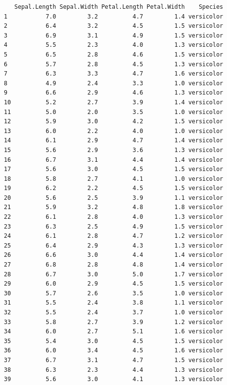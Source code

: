 \documentclass[
  a4paper,
]{ltjsbook}
\begin{document}
\begin{verbatim}
   Sepal.Length Sepal.Width Petal.Length Petal.Width    Species
1           7.0         3.2          4.7         1.4 versicolor
2           6.4         3.2          4.5         1.5 versicolor
3           6.9         3.1          4.9         1.5 versicolor
4           5.5         2.3          4.0         1.3 versicolor
5           6.5         2.8          4.6         1.5 versicolor
6           5.7         2.8          4.5         1.3 versicolor
7           6.3         3.3          4.7         1.6 versicolor
8           4.9         2.4          3.3         1.0 versicolor
9           6.6         2.9          4.6         1.3 versicolor
10          5.2         2.7          3.9         1.4 versicolor
11          5.0         2.0          3.5         1.0 versicolor
12          5.9         3.0          4.2         1.5 versicolor
13          6.0         2.2          4.0         1.0 versicolor
14          6.1         2.9          4.7         1.4 versicolor
15          5.6         2.9          3.6         1.3 versicolor
16          6.7         3.1          4.4         1.4 versicolor
17          5.6         3.0          4.5         1.5 versicolor
18          5.8         2.7          4.1         1.0 versicolor
19          6.2         2.2          4.5         1.5 versicolor
20          5.6         2.5          3.9         1.1 versicolor
21          5.9         3.2          4.8         1.8 versicolor
22          6.1         2.8          4.0         1.3 versicolor
23          6.3         2.5          4.9         1.5 versicolor
24          6.1         2.8          4.7         1.2 versicolor
25          6.4         2.9          4.3         1.3 versicolor
26          6.6         3.0          4.4         1.4 versicolor
27          6.8         2.8          4.8         1.4 versicolor
28          6.7         3.0          5.0         1.7 versicolor
29          6.0         2.9          4.5         1.5 versicolor
30          5.7         2.6          3.5         1.0 versicolor
31          5.5         2.4          3.8         1.1 versicolor
32          5.5         2.4          3.7         1.0 versicolor
33          5.8         2.7          3.9         1.2 versicolor
34          6.0         2.7          5.1         1.6 versicolor
35          5.4         3.0          4.5         1.5 versicolor
36          6.0         3.4          4.5         1.6 versicolor
37          6.7         3.1          4.7         1.5 versicolor
38          6.3         2.3          4.4         1.3 versicolor
39          5.6         3.0          4.1         1.3 versicolor

\end{verbatim}
\end{document}
